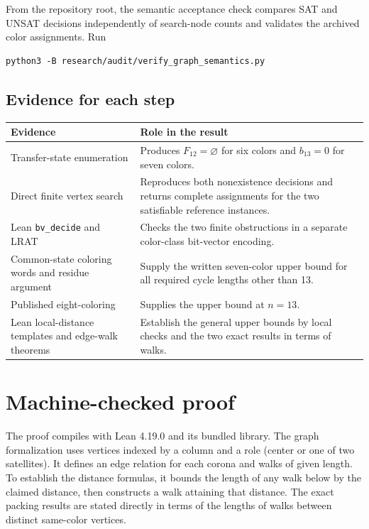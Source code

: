 \documentclass[11pt]{article}
\begin{document}
From the repository root, the semantic acceptance check compares
SAT and UNSAT decisions independently of search-node counts and
validates the archived color assignments. Run
\begin{Verbatim}[fontsize=\small]
python3 -B research/audit/verify_graph_semantics.py
\end{Verbatim}

\subsection{Evidence for each step}
\begin{center}\small
\begin{tabular}{@{}>{\raggedright\arraybackslash}p{.39\linewidth}
                   >{\raggedright\arraybackslash}p{.55\linewidth}@{}}
\toprule
Evidence & Role in the result\\
\midrule
Transfer-state enumeration
  & Produces \(F_{12}=\varnothing\) for six colors and \(b_{13}=0\) for
    seven colors.\\
Direct finite vertex search
  & Reproduces both nonexistence decisions and returns complete
    assignments for the two satisfiable reference instances.\\
Lean \texttt{bv\_decide} and LRAT
  & Checks the two finite obstructions in a separate color-class
    bit-vector encoding.\\
Common-state coloring words and residue argument
  & Supply the written seven-color upper bound for all required
    cycle lengths other than 13.\\
Published eight-coloring
  & Supplies the upper bound at \(n=13\).\\
Lean local-distance templates and edge-walk theorems
  & Establish the general upper bounds by local checks and the two
    exact results in terms of walks.\\
\bottomrule
\end{tabular}
\end{center}

\section{Machine-checked proof}
\label{sec:lean}
The proof compiles with Lean 4.19.0 and its bundled library. The graph
formalization uses vertices indexed by a column and a role (center or
one of two satellites). It defines an edge relation for each corona
and walks of given length. To establish the distance formulas, it
bounds the length of any walk below by the claimed distance, then
constructs a walk attaining that distance. The exact packing results are
stated directly in terms of the lengths of walks between distinct
same-color vertices.
\end{document}
